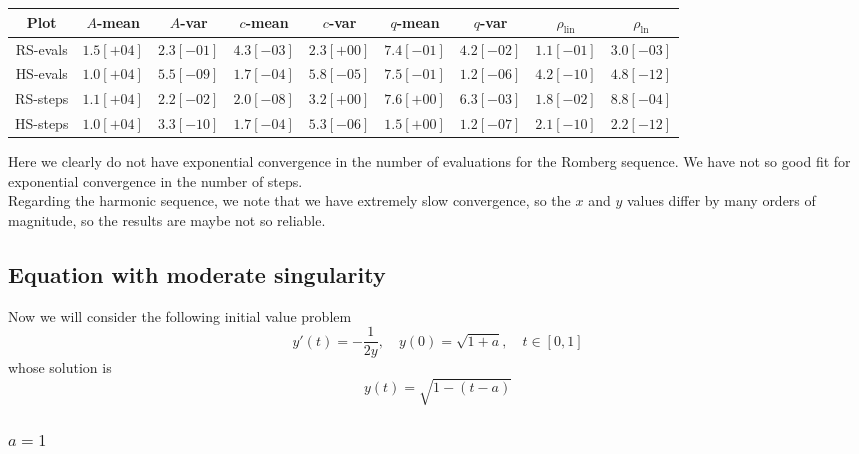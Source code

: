 \begin{table}[H]
    \centering
    \small
    \begin{tabular}{c||c|c|c|c|c|c|c|c}
Plot & \(A\)-mean & \(A\)-var & \(c\)-mean & \(c\)-var & \(q\)-mean & \(q\)-var & \(\rho_{\operatorname{lin}}\) & \(\rho_{\ln}\)\\\hline
\rowcolor{red}
RS-evals & \(1.5[+04]\) & \(2.3[-01]\) & \(4.3[-03]\) & \(2.3[+00]\) & \(7.4[-01]\) & \(4.2[-02]\) & \(1.1[-01]\) & \(3.0[-03]\) \\
\rowcolor{yellow}
HS-evals & \(1.0[+04]\) & \(5.5[-09]\) & \(1.7[-04]\) & \(5.8[-05]\) & \(7.5[-01]\) & \(1.2[-06]\) & \(4.2[-10]\) & \(4.8[-12]\) \\
\rowcolor{yellow}
RS-steps & \(1.1[+04]\) & \(2.2[-02]\) & \(2.0[-08]\) & \(3.2[+00]\) & \(7.6[+00]\) & \(6.3[-03]\) & \(1.8[-02]\) & \(8.8[-04]\) \\
\rowcolor{yellow}
HS-steps & \(1.0[+04]\) & \(3.3[-10]\) & \(1.7[-04]\) & \(5.3[-06]\) & \(1.5[+00]\) & \(1.2[-07]\) & \(2.1[-10]\) & \(2.2[-12]\) \\
    \end{tabular}
    \label{tab:my_label}
\end{table}

Here we clearly do not have exponential convergence in the number of evaluations for the Romberg sequence. We have not so good fit for exponential convergence in the number of steps.\\

Regarding the harmonic sequence, we note that we have extremely slow convergence, so the \(x\) and \(y\) values differ by many orders of magnitude, so the results are maybe not so reliable.

\subsection{Equation with moderate singularity}

Now we will consider the following initial value problem
\begin{equation}
y'(t) = -\frac{1}{2y}, \quad y(0) = \sqrt{1+a},\quad t\in [0,1]\label{47}
\end{equation}
whose solution is 
\[
y(t) = \sqrt{1 - (t-a)}
\]

\subsubsection{\(a = 1\)}

